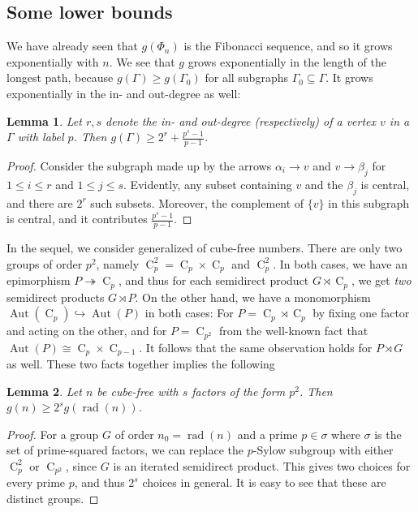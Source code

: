 \documentclass{article}
\newcommand{\aut}[1]{\operatorname{Aut}(#1)}
\newcommand{\cyc}[1]{\operatorname{C}_{#1}}
\theoremstyle{plain}
\newtheorem{lem}{Lemma}[section]
\theoremstyle{definition}
\begin{document}
\subsection{Some lower bounds}
We have already seen that $g(\Phi_n)$ is the Fibonacci sequence, and so it grows exponentially with $n$. We see that $g$ grows exponentially in the length of the longest path, because $g(\Gamma) \ge  g(\Gamma_0)$ for all subgraphs $\Gamma_0 \subseteq \Gamma$. It grows exponentially in the in- and out-degree as well:
\begin{lem}
	Let $r, s$ denote the in- and out-degree (respectively) of a vertex $v$ in a  $\Gamma$ with label $p$. Then $g(\Gamma) \ge 2^r + \frac{p^s - 1}{p - 1}$.
\end{lem}
\begin{proof}
	Consider the subgraph made up by the arrows $\alpha_i \rightarrow v$ and $v \rightarrow \beta_j$ for $1 \le i \le r$ and $1 \le j \le s$. Evidently, any subset containing $v$ and the $\beta_j$ is central, and there are $2^r$ such subsets. Moreover, the complement of $\{v\}$ in this subgraph is central, and it contributes \nolinebreak[4] $\frac{p^s - 1}{p - 1}$.
\end{proof}
In the sequel, we consider generalized  of cube-free numbers. There are only two groups of order $p^2$, namely $\cyc{p}^2 = \cyc{p} \times \cyc{p}$ and $\cyc{p}^2$. In both cases, we have an epimorphism $P \twoheadrightarrow \cyc{p}$, and thus for each semidirect product $G \rtimes \cyc{p}$, we get \textit{two} semidirect products $G \rtimes P$. On the other hand, we have a monomorphism $\aut{\cyc{p}} \hookrightarrow \aut{P}$ in both cases: For $P = \cyc{p} \rtimes \cyc{p}$ by fixing one factor and acting on the other, and for $P = \cyc{p^2}$ from the well-known fact that $\aut{P} \cong \cyc{p} \times \cyc{p - 1}$. It follows that the same observation holds for $P \rtimes G$ as well. These two facts together implies the following

\begin{lem}
	Let $n$ be cube-free with $s$ factors of the form $p^2$. Then $g(n) \ge 2^s g(\operatorname{rad}(n))$.
\end{lem}
\begin{proof}
	For a group $G$ of order $n_0 = \operatorname{rad}(n)$ and a prime $p \in \sigma$ where $\sigma$ is the set of prime-squared factors, we can replace the $p$-Sylow subgroup with either $\cyc{p}^2$ or $\cyc{p^2}$, since $G$ is an iterated semidirect product. This gives two choices for every prime $p$, and thus $2^s$ choices in general. It is easy to see that these are distinct groups.
\end{proof}
\end{document}

